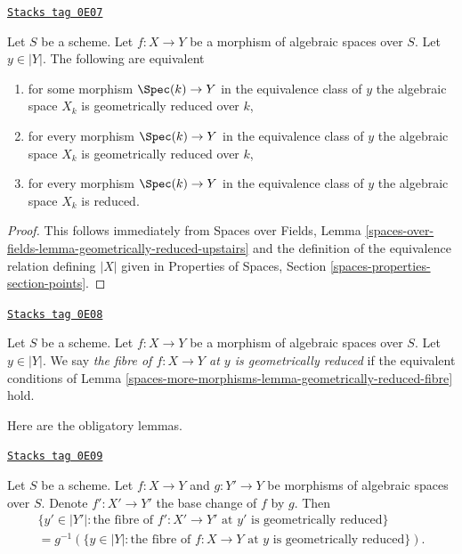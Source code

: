 \begin{lemma}
\label{spaces-more-morphisms-lemma-geometrically-reduced-fibre}
\href{https://stacks.math.columbia.edu/tag/0E07}{\texttt{Stacks tag 0E07}}

Let $S$ be a scheme. Let $f : X \to Y$ be a
morphism of algebraic spaces over $S$. Let $y \in |Y|$.
The following are equivalent
\begin{enumerate}
\item for some morphism $\Spec(k) \to Y$ in the equivalence class
of $y$ the algebraic space $X_k$ is geometrically reduced over $k$,
\item for every morphism $\Spec(k) \to Y$ in the equivalence class
of $y$ the algebraic space $X_k$ is geometrically reduced over $k$,
\item for every morphism $\Spec(k) \to Y$ in the equivalence class
of $y$ the algebraic space $X_k$ is reduced.
\end{enumerate}
\end{lemma}

\begin{proof}
This follows immediately from Spaces over Fields, Lemma
\ref{spaces-over-fields-lemma-geometrically-reduced-upstairs}
and the definition of the equivalence relation defining $|X|$
given in
Properties of Spaces, Section \ref{spaces-properties-section-points}.
\end{proof}

\begin{definition}
\label{spaces-more-morphisms-definition-geometrically-reduced-fibre}
\href{https://stacks.math.columbia.edu/tag/0E08}{\texttt{Stacks tag 0E08}}

Let $S$ be a scheme. Let $f : X \to Y$ be a
morphism of algebraic spaces over $S$. Let $y \in |Y|$.
We say {\it the fibre of $f : X \to Y$ at $y$ is geometrically reduced}
if the equivalent conditions of
Lemma \ref{spaces-more-morphisms-lemma-geometrically-reduced-fibre} hold.
\end{definition}

Here are the obligatory lemmas.

\begin{lemma}
\label{spaces-more-morphisms-lemma-base-change-fibres-geometrically-reduced}
\href{https://stacks.math.columbia.edu/tag/0E09}{\texttt{Stacks tag 0E09}}

Let $S$ be a scheme. Let $f : X \to Y$ and $g : Y' \to Y$
be morphisms of algebraic spaces over $S$. Denote
$f' : X' \to Y'$ the base change of $f$ by $g$. Then
\begin{align*}
\{y' \in |Y'| :
\text{the fibre of }f' : X' \to Y'\text{ at }y'
\text{ is geometrically reduced}\} \\
= g^{-1}(\{y \in |Y| :
\text{the fibre of }f : X \to Y\text{ at }y
\text{ is geometrically reduced}\}).
\end{align*}
\end{lemma}

